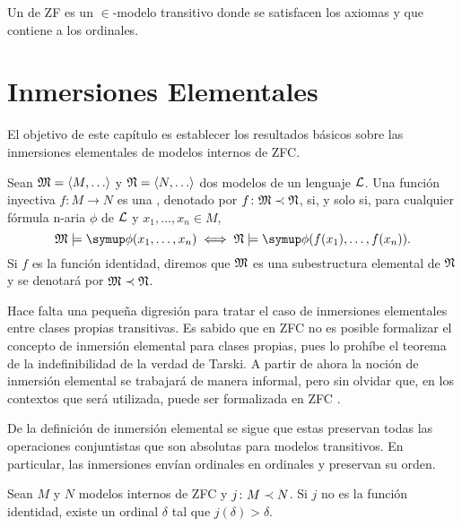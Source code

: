 \begin{defi}
    Un  de ZF es un $\in$-modelo transitivo
    donde se satisfacen los axiomas y que contiene a los ordinales.
\end{defi}

\section{Inmersiones Elementales}
\label{sec:elem-embed}

El objetivo de este capítulo es establecer los resultados básicos
sobre las inmersiones elementales de modelos internos de ZFC.

\begin{defi}
    Sean $\model{M} = \op{M,\dots}$ y $\model{N} = \op{N,\dots}$ dos modelos de un lenguaje $\mathcal { L }$.
    Una función inyectiva $f\colon M\to N$ es una ,
    denotado por $f\colon \mathfrak { M }\prec\mathfrak { N }$, si, y solo si, para cualquier fórmula
    n-aria $\phi$ de $\mathcal { L }$ y $x_1,\dots,x_n \in M$,
    \[
        \model{M}\models\phi(x_1,\dots,x_n) \iff \model{N}\models\phi(f(x_1),\dots,f(x_n)).
    \]
    Si $f$ es la función identidad, diremos que $\mathfrak { M }$
    es una subestructura elemental de $\mathfrak { N }$ y se denotará por $\mathfrak { M }\prec\mathfrak { N }$.
\end{defi}

Hace falta una pequeña digresión para tratar el caso de inmersiones elementales
entre clases propias transitivas. Es sabido que en ZFC no es posible formalizar
el concepto de inmersión elemental para clases propias, pues lo prohíbe el teorema
de la indefinibilidad de la verdad de Tarski.
A partir de ahora la noción de inmersión elemental se trabajará de manera informal,
pero sin olvidar que, en los contextos que será utilizada, puede ser formalizada
en ZFC \autocite[pág. 45-46]{kanamori_higher_2009}.

De la definición de inmersión elemental se sigue que estas preservan todas
las operaciones conjuntistas que son absolutas para modelos transitivos.
En particular, las inmersiones envían ordinales en ordinales y
preservan su orden.

\begin{teo}\label{teo:elem-embed-trivial}
    Sean $M$ y $N$ modelos internos de ZFC y $j\colon M\prec N$.
    Si $j$ no es la función identidad, existe un ordinal $\delta$
    tal que $j(\delta)>\delta$.
\end{teo}

